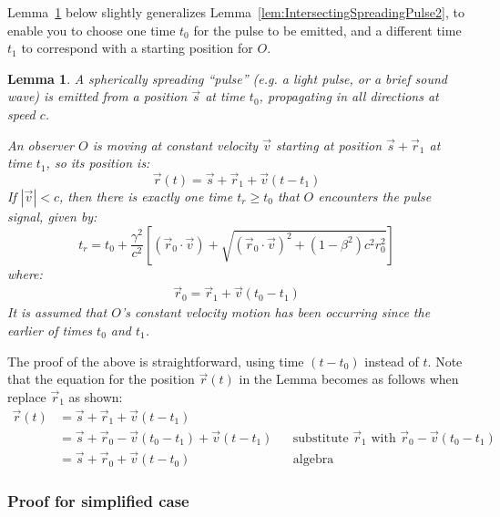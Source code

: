 \documentclass[a4paper]{article}
\theoremstyle{plain}
\newtheorem{lemma}[theorem]{Lemma}
\theoremstyle{definition}
\newcommand{\vect}[1]{\vec{#1}}
\begin{document}
Lemma~\ref{lem:IntersectingSpreadingPulse} below slightly generalizes
Lemma~\ref{lem:IntersectingSpreadingPulse2}, to enable you to choose
one time $t_0$ for the pulse to be emitted, and a different time $t_1$
to correspond with a starting position for $O$.
\begin{lemma}
\label{lem:IntersectingSpreadingPulse}
A spherically spreading ``pulse'' (e.g. a light pulse, or a brief
sound wave) is emitted from a position $\vect{s}$ at time $t_0$,
propagating in all directions at speed $c$.

An observer $O$ is moving at constant velocity $\vect{v}$ starting at
position $\vect{s} + \vect{r}_1$ at time $t_1$, so its position is:
\begin{equation}
\vect{r}(t) = \vect{s} + \vect{r}_1 + \vect{v}(t - t_1)
\end{equation}
If $|\vect{v}| < c$, then there is exactly one time $t_r \geq t_0$
that $O$ encounters the pulse signal, given by:
\begin{equation}
t_r = t_0 + \frac{\gamma^2}{c^2} \left[ (\vect{r}_0 \cdot \vect{v}) + \sqrt{(\vect{r}_0 \cdot \vect{v})^2 + (1-\beta^2)c^2 r_0^2} \right]
\end{equation}
where:
\begin{align*}
\vect{r}_0 = \vect{r}_1 + \vect{v}(t_0-t_1)
\end{align*}
It is assumed that $O$'s constant velocity motion has been occurring
since the earlier of times $t_0$ and $t_1$.
\end{lemma}

The proof of the above is straightforward, using time $(t-t_0)$
instead of $t$.  Note that the equation for the position $\vect{r}(t)$
in the Lemma becomes as follows when replace $\vect{r}_1$ as shown:
\begin{align*}
\vect{r}(t)
  & = \vect{s} + \vect{r}_1 + \vect{v}(t - t_1) \\
  & = \vect{s} + \vect{r}_0 - \vect{v}(t_0-t_1) + \vect{v}(t - t_1) & & \text{substitute $\vect{r}_1$ with $\vect{r}_0 - \vect{v}(t_0-t_1)$} \\
  & = \vect{s} + \vect{r}_0 + \vect{v}(t - t_0) & & \text{algebra}
\end{align*}


\subsubsection{Proof for simplified case}
\end{document}
